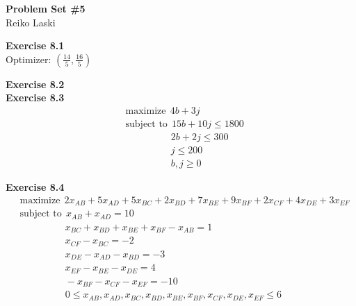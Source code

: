 \documentclass[letterpaper,12pt]{article}
\theoremstyle{definition}
\begin{document}
\begin{flushleft}
  \textbf{\large{Problem Set \#5}} \\
  Reiko Laski
\end{flushleft}

\textbf{Exercise 8.1} \\
Optimizer: $(\frac{14}{5}, \frac{16}{5})$

\textbf{Exercise 8.2} \\


\textbf{Exercise 8.3}
\begin{align*}
  &\text{maximize} \ \ 4b + 3j \\
  &\text{subject to} \ \ 15b + 10j \leq 1800 \\
  &\qquad \qquad \ \ \  2b + 2j \leq 300 \\
  &\qquad \qquad \ \ \  j \leq 200 \\
  &\qquad \qquad \ \ \  b, j \geq 0
\end{align*}

\textbf{Exercise 8.4}
\begin{align*}
  &\text{maximize} \ \ 2x_{AB} + 5x_{AD} + 5x_{BC} + 2x_{BD} + 7x_{BE} + 9x_{BF} + 2x_{CF} + 4x_{DE} + 3x_{EF} \\
  &\text{subject to} \ \ x_{AB} + x_{AD} = 10 \\
  &\qquad \qquad \ \ \ x_{BC} + x_{BD} + x_{BE} + x_{BF} - x_{AB} = 1 \\
  &\qquad \qquad \ \ \ x_{CF} - x_{BC} = -2 \\
  &\qquad \qquad \ \ \ x_{DE} - x_{AD} - x_{BD} = -3 \\
  &\qquad \qquad \ \ \ x_{EF} - x_{BE} - x_{DE} = 4 \\
  &\qquad \qquad \ \ \ -x_{BF} - x_{CF} - x_{EF} = -10 \\
  &\qquad \qquad \ \ \ 0 \leq x_{AB}, x_{AD}, x_{BC}, x_{BD}, x_{BE}, x_{BF}, x_{CF}, x_{DE}, x_{EF} \leq 6
\end{align*}
\end{document}
